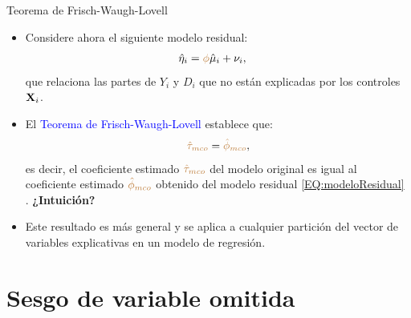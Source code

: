 \documentclass[9pt, xcolor=dvipsnames]{beamer}
\begin{document}
\begin{frame}{Teorema de Frisch-Waugh-Lovell}\label{DIAP:FWL}
\begin{itemize}
    \item Considere ahora el siguiente modelo residual:
    \begin{align}\label{EQ:modeloResidual}
        \hat{\eta}_i &= \textcolor{brown}{\phi} \hat{\mu}_i + \nu_i,
    \end{align}
    que relaciona las partes de \(Y_i\) y \(D_i\) que no están explicadas por los controles \(\textbf{X}_i\).
    \item El \textcolor{blue}{Teorema de Frisch-Waugh-Lovell} establece que:
    \begin{align*}
        \textcolor{brown}{\hat{\tau}_{mco}} = \textcolor{brown}{\hat{\phi}_{mco}},
    \end{align*}
    es decir, el coeficiente estimado \(\textcolor{brown}{\hat{\tau}_{mco}}\) del modelo original es igual al coeficiente estimado \(\textcolor{brown}{\hat{\phi}_{mco}}\) obtenido del modelo residual \eqref{EQ:modeloResidual} \hyperlink{ANEX:FWL}{{}}. \textbf{¿Intuición?}
    \vspace{1em}
    \item Este resultado es más general y se aplica a cualquier partición del vector de variables explicativas en un modelo de regresión.
\end{itemize}
\end{frame}


\section{Sesgo de variable omitida}
\end{document}
